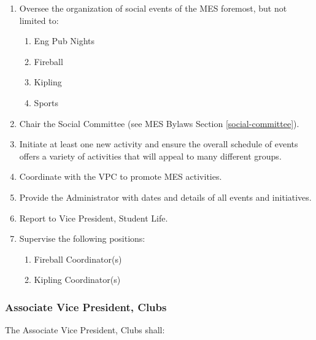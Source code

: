\begin{enumerate}
 \item
  Oversee the organization of social events of the MES foremost, but not limited to:

  \begin{enumerate}
   \item
    Eng Pub Nights
   \item
    Fireball
   \item
    Kipling
   \item
    Sports
  \end{enumerate}
 \item
  Chair the Social Committee (see MES Bylaws Section \ref{social-committee}).
 \item
  Initiate at least one new activity and ensure the overall schedule of events offers a variety of activities that will appeal to many different groups.
 \item
  Coordinate with the VPC to promote MES activities.
 \item
  Provide the Administrator with dates and details of all events and initiatives.
 \item
  Report to Vice President, Student Life.
 \item
  Supervise the following positions:

  \begin{enumerate}
   \item
    Fireball Coordinator(s)
   \item
    Kipling Coordinator(s)

  \end{enumerate}
\end{enumerate}

\subsubsection{Associate Vice President, Clubs}
\label{associate-vice-president-clubs}
The Associate Vice President, Clubs shall:

